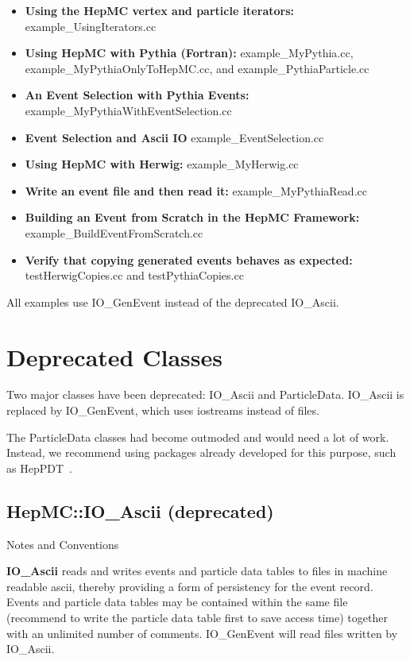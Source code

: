 \documentclass[11pt,letterpaper]{article}
\begin{document}
\begin{itemize}\setlength{\itemsep}{0pt}
  \item{\bf Using the HepMC vertex and particle iterators:}
       {example\_UsingIterators.cc} 
  \item{\bf Using HepMC with Pythia (Fortran):}
      {example\_MyPythia.cc,
      example\_MyPythiaOnlyToHepMC.cc, and
      example\_PythiaParticle.cc
      }
  \item{\bf An Event Selection with Pythia Events:}
      {example\_MyPythiaWithEventSelection.cc}
  \item{\bf Event Selection and Ascii IO}
      {example\_EventSelection.cc}
  \item{\bf Using HepMC with Herwig:}
     {example\_MyHerwig.cc}
 \item{\bf Write an event file and then read it:}
     {example\_MyPythiaRead.cc}
  \item{\bf Building an Event from Scratch in the HepMC Framework:}
     {example\_BuildEventFromScratch.cc}
  \item{\bf Verify that copying generated events behaves as expected:}
     {testHerwigCopies.cc and testPythiaCopies.cc}
\end{itemize}

All examples use IO\_GenEvent instead of the deprecated IO\_Ascii.

%
%

\section{Deprecated Classes}

Two major classes have been deprecated: IO\_Ascii and ParticleData.
IO\_Ascii is replaced by IO\_GenEvent, which uses iostreams instead of files.

The ParticleData classes had become outmoded and would need a lot of
work.  Instead, we recommend using packages already developed for this
purpose, such as HepPDT~\cite{heppdt}.

%
%

\subsection{HepMC::IO\_Ascii (deprecated)}

\begin{myitemize}{Notes and Conventions}
 \item {\bf IO\_Ascii} reads and writes events and particle data
    tables to files in machine readable ascii, thereby providing a
    form of persistency for the event record. Events and particle data
    tables may be contained within the same file (recommend to write
    the particle data table first to save access time) together with
    an unlimited number of comments. 
   IO\_GenEvent will read files written by IO\_Ascii.
\end{myitemize}
\end{document}

